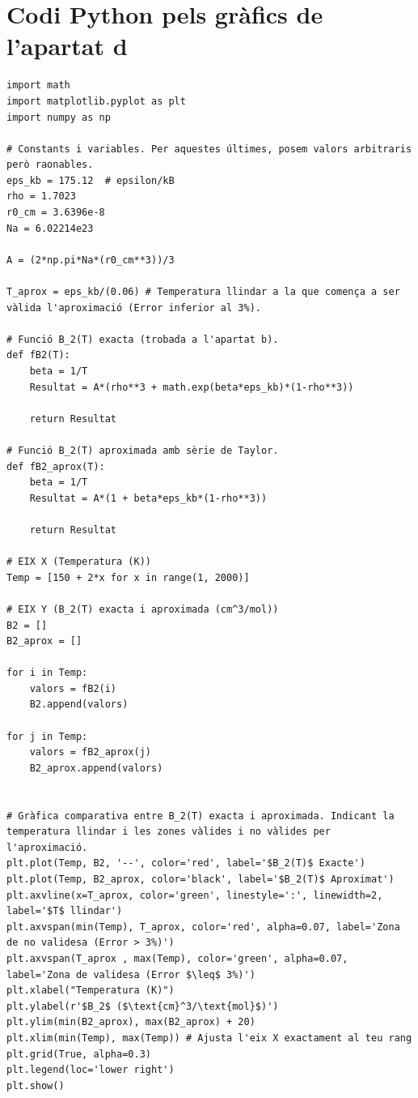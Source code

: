 \documentclass[a4paper, 10pt]{article}
\begin{document}
\newpage
\section{Codi Python pels gràfics de l'apartat d}

\begin{lstlisting}[caption={Codi pels gràfics trobats a l'apartat d.}]
import math
import matplotlib.pyplot as plt
import numpy as np

# Constants i variables. Per aquestes últimes, posem valors arbitraris però raonables. 
eps_kb = 175.12  # epsilon/kB      
rho = 1.7023              
r0_cm = 3.6396e-8          
Na = 6.02214e23           

A = (2*np.pi*Na*(r0_cm**3))/3  

T_aprox = eps_kb/(0.06) # Temperatura llindar a la que comença a ser vàlida l'aproximació (Error inferior al 3%).

# Funció B_2(T) exacta (trobada a l'apartat b).
def fB2(T):
	beta = 1/T
	Resultat = A*(rho**3 + math.exp(beta*eps_kb)*(1-rho**3))
	
	return Resultat

# Funció B_2(T) aproximada amb sèrie de Taylor. 
def fB2_aprox(T): 
	beta = 1/T
	Resultat = A*(1 + beta*eps_kb*(1-rho**3))
	
	return Resultat

# EIX X (Temperatura (K))
Temp = [150 + 2*x for x in range(1, 2000)]

# EIX Y (B_2(T) exacta i aproximada (cm^3/mol))
B2 = []
B2_aprox = []

for i in Temp:
	valors = fB2(i)
	B2.append(valors)

for j in Temp: 
	valors = fB2_aprox(j)
	B2_aprox.append(valors)


# Gràfica comparativa entre B_2(T) exacta i aproximada. Indicant la temperatura llindar i les zones vàlides i no vàlides per l'aproximació. 
plt.plot(Temp, B2, '--', color='red', label='$B_2(T)$ Exacte')
plt.plot(Temp, B2_aprox, color='black', label='$B_2(T)$ Aproximat')
plt.axvline(x=T_aprox, color='green', linestyle=':', linewidth=2, label='$T$ llindar')
plt.axvspan(min(Temp), T_aprox, color='red', alpha=0.07, label='Zona de no validesa (Error > 3%)')
plt.axvspan(T_aprox , max(Temp), color='green', alpha=0.07, label='Zona de validesa (Error $\leq$ 3%)')
plt.xlabel("Temperatura (K)")
plt.ylabel(r'$B_2$ ($\text{cm}^3/\text{mol}$)')
plt.ylim(min(B2_aprox), max(B2_aprox) + 20)
plt.xlim(min(Temp), max(Temp)) # Ajusta l'eix X exactament al teu rang
plt.grid(True, alpha=0.3)
plt.legend(loc='lower right') 
plt.show()


\end{lstlisting}
\end{document}
